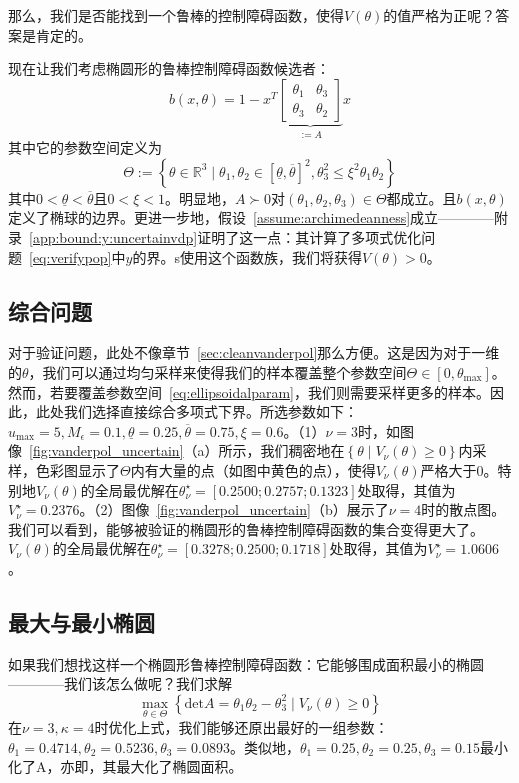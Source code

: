 那么，我们是否能找到一个鲁棒的控制障碍函数，使得$V(\theta)$的值严格为正呢？答案是肯定的。

现在让我们考虑椭圆形的鲁棒控制障碍函数候选者：
\begin{equation}\label{eq:ellipsoidalcbf}
    b(x, \theta) = 1 - x^T \underbrace{
        \left[ \begin{matrix}
            \theta_1 & \theta_3 \\
            \theta_3 & \theta_2
        \end{matrix} \right]
    }_{:= A} x
\end{equation}
其中它的参数空间定义为
\begin{equation}\label{eq:ellipsoidalparam}
    \Theta := \left\{ 
        \theta \in \mathbb{R}^3 \mid \theta_1, \theta_2 \in [\underline{\theta}, \overline{\theta}]^2, \theta_3^2 \le \xi^2 \theta_1 \theta_2
     \right\}
\end{equation}
其中$0 < \underline{\theta} < \overline{\theta}$且$0 < \xi < 1$。明显地，$A \succ 0$对$(\theta_1, \theta_2, \theta_3) \in \Theta$都成立。且$b(x, \theta)$定义了椭球的边界。更进一步地，假设~\ref{assume:archimedeanness}成立————附录~\ref{app:bound:y:uncertainvdp}证明了这一点：其计算了多项式优化问题~\eqref{eq:verifypop}中$y$的界。s使用这个函数族，我们将获得$V(\theta) > 0$。

\subsection{综合问题}
对于验证问题，此处不像章节~\ref{sec:cleanvanderpol}那么方便。这是因为对于一维的$\theta$，我们可以通过均匀采样来使得我们的样本覆盖整个参数空间$\Theta \in [0, \theta_{\max}]$。然而，若要覆盖参数空间~\eqref{eq:ellipsoidalparam}，我们则需要采样更多的样本。因此，此处我们选择直接综合多项式下界。所选参数如下：$u_{\max} = 5, M_\epsilon = 0.1, \underline{\theta} = 0.25, \overline{\theta} = 0.75, \xi = 0.6$。（1）$\nu = 3$时，如图像~\ref{fig:vanderpol_uncertain}（a）所示，我们稠密地在$\left\{ \theta \mid V_\nu(\theta) \ge 0 \right\}$内采样，色彩图显示了$\Theta$内有大量的点（如图中黄色的点），使得$V_\nu(\theta)$严格大于$0$。特别地$V_\nu(\theta)$的全局最优解在$\theta^\star_\nu = [0.2500;0.2757;0.1323]$处取得，其值为$V^\star_\nu = 0.2376$。（2）图像~\ref{fig:vanderpol_uncertain}（b）展示了$\nu = 4$时的散点图。我们可以看到，能够被验证的椭圆形的鲁棒控制障碍函数的集合变得更大了。$V_\nu(\theta)$的全局最优解在$\theta^\star_\nu = [0.3278;0.2500;0.1718]$处取得，其值为$V^\star_\nu = 1.0606$。

\subsection{最大与最小椭圆}
如果我们想找这样一个椭圆形鲁棒控制障碍函数：它能够围成面积最小的椭圆————我们该怎么做呢？我们求解
\begin{equation}
    \max_{\theta \in \Theta} \left\{ \text{det}A = \theta_1 \theta_2 - \theta_3^2 \mid V_\nu(\theta) \ge 0 \right\}
\end{equation}
在$\nu = 3, \kappa = 4$时优化上式，我们能够还原出最好的一组参数：$\theta_1=0.4714,\theta_2=0.5236,\theta_3 = 0.0893$。类似地，$\theta_1=0.25,\theta_2=0.25,\theta_3 = 0.15$最小化了$\text{A}$，亦即，其最大化了椭圆面积。


